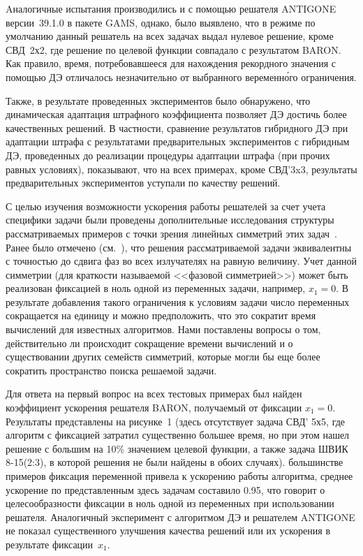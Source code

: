 Aналогичные испытания производились и с помощью решателя ANTIGONE версии~39.1.0 в пакете GAMS, однако, было выявлено, что в режиме по умолчанию данный решатель на всех задачах выдал нулевое решение, кроме СВД~2х2, где решение по целевой функции совпадало с результатом BARON. Как правило, время, потребовавшееся для нахождения рекордного значения с помощью ДЭ отличалось незначительно от выбранного веременн\'{о}го ограничения.

Также, в результате проведенных экспериментов было обнаружено, что динамическая адаптация штрафного коэффициента позволяет ДЭ достичь более качественных решений.
В частности, сравнение результатов гибридного ДЭ при адаптации штрафа с результатами предварительных экспериментов с гибридным ДЭ, проведенных до реализации процедуры адаптации штрафа (при прочих равных условиях), показывают, что на всех примерах, кроме СВД'3x3, результаты предварительных экспериментов уступали по качеству решений.  

С целью изучения возможности ускорения работы решателей за счет учета специфики задачи были проведены дополнительные исследования
структуры рассматриваемых примеров с точки зрения линейных симметрий этих задач~\cite{yurkov:symmetry}.
Ранее было отмечено (см.~\cite{tyu:daor}), что решения рассматриваемой задачи эквивалентны с точностью до сдвига
фаз во всех излучателях на равную величину.
Учет данной симметрии (для краткости называемой <<фазовой симметрией>>) может
быть реализован фиксацией в ноль одной из переменных задачи, например, $x_1=0$.
В результате добавления такого ограничения к условиям задачи число переменных сокращается
на единицу и можно предположить, что это сократит время вычислений для известных алгоритмов.
Нами поставлены вопросы о том, действительно ли происходит сокращение времени вычислений и о
существовании других семейств симметрий, которые могли бы еще более сократить пространство поиска решаемой задачи.

Для ответа на первый вопрос на всех тестовых примерах был найден коэффициент ускорения решателя BARON,
получаемый от фиксации $x_1=0$. Результаты представлены на рисунке~1 (здесь отсутствует задача СВД' 5х5, где
алгоритм с фиксацией затратил существенно большее время, но при этом нашел решение с большим на 10\% значением
целевой функции, а также задача ШВИК 8-15(2:3), в которой решения не были найдены в обоих случаях).
 большинстве примеров фиксация переменной привела к ускорению работы алгоритма, среднее ускорение по
представленным здесь задачам составило 0.95, что говорит о целесообразности фиксации в ноль одной из переменных
при использовании решателя. Аналогичный эксперимент с алгоритмом ДЭ и решателем ANTIGONE не показал существенного
улучшения качества решений или их ускорения в результате фиксации~$x_1$.

